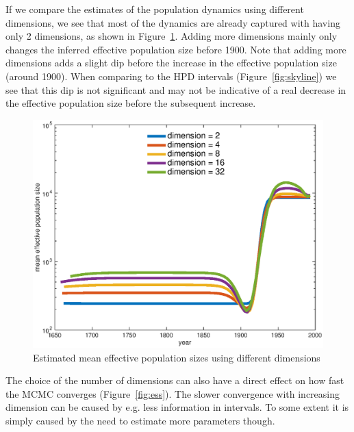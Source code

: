 \documentclass[11pt]{article}
\newcommand{\fixme}[1]{\textcolor{red}{\texttt{{\bf FIX ME:} #1}}}
\begin{document}
If we compare the estimates of the population dynamics using different dimensions, we see that most of the dynamics are already captured with having only 2 dimensions, as shown in Figure~\ref{fig:comparison}. Adding more dimensions mainly only changes the inferred effective population size before 1900. Note that adding more dimensions adds a slight dip before the increase in the effective population size (around 1900). When comparing to the HPD intervals (Figure~\ref{fig:skyline}) we see that this dip is not significant and may not be indicative of a real decrease in the effective population size before the subsequent increase.

\begin{figure}[h!]
\centering
\includegraphics[scale=0.5]{figures/comparison_dimension.eps}
\caption{\small Estimated mean effective population sizes using different dimensions}
\label{fig:comparison}
\end{figure}

The choice of the number of dimensions can also have a direct effect on how fast the MCMC converges (Figure~\ref{fig:ess}). The slower convergence with increasing dimension can be caused by e.g. less information in intervals. To some extent it is simply caused by the need to estimate more parameters though.
\end{document}
